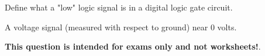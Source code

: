 

Define what a "low" logic signal is in a digital logic gate circuit.







A voltage signal (measured with respect to ground) near 0 volts.







{\bf This question is intended for exams only and not worksheets!}.




